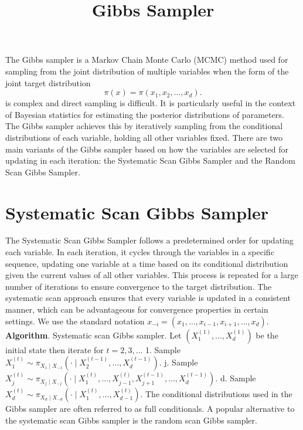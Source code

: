 \documentclass[10pt]{article}
\title{Gibbs Sampler}
\begin{document}
The Gibbs sampler is a Markov Chain Monte Carlo (MCMC) method used for sampling from the joint distribution of multiple variables when the form of the joint target distribution $$
\pi(x)=\pi\left(x_1, x_2, \ldots, x_d\right) .
$$
is complex and direct sampling is difficult. It is particularly useful in the context of Bayesian statistics for estimating the posterior distributions of parameters. The Gibbs sampler achieves this by iteratively sampling from the conditional distributions of each variable, holding all other variables fixed. There are two main variants of the Gibbs sampler based on how the variables are selected for updating in each iteration: the Systematic Scan Gibbs Sampler and the Random Scan Gibbs Sampler.

\section{Systematic Scan Gibbs Sampler}

The Systematic Scan Gibbs Sampler follows a predetermined order for updating each variable. In each iteration, it cycles through the variables in a specific sequence, updating one variable at a time based on its conditional distribution given the current values of all other variables. This process is repeated for a large number of iterations to ensure convergence to the target distribution. The systematic scan approach ensures that every variable is updated in a consistent manner, which can be advantageous for convergence properties in certain settings.
\newline
We use the standard notation $x_{-i}=\left(x_1, \ldots, x_{i-1}, x_{i+1}, \ldots, x_d\right)$.
\newline
\textbf{Algorithm}. Systematic scan Gibbs sampler. Let $\left(X_1^{(1)}, \ldots, X_d^{(1)}\right)$ be the initial state then iterate for $t=2,3, \ldots$
1. Sample $X_1^{(t)} \sim \pi_{X_1 \mid X_{-1}}\left(\cdot \mid X_2^{(t-1)}, \ldots, X_d^{(t-1)}\right)$. \newline
j. Sample $X_j^{(t)} \sim \pi_{X_j \mid X_{-j}}\left(\cdot \mid X_1^{(t)}, \ldots, X_{j-1}^{(t)}, X_{j+1}^{(t-1)}, \ldots, X_d^{(t-1)}\right)$. \newline
d. Sample $X_d^{(t)} \sim \pi_{X_d \mid X_{-d}}\left(\cdot \mid X_1^{(t)}, \ldots, X_{d-1}^{(t)}\right)$.\newline
The conditional distributions used in the Gibbs sampler are often referred to as full conditionals. A popular alternative to the systematic scan Gibbs sampler is the random scan Gibbs sampler.
\end{document}
